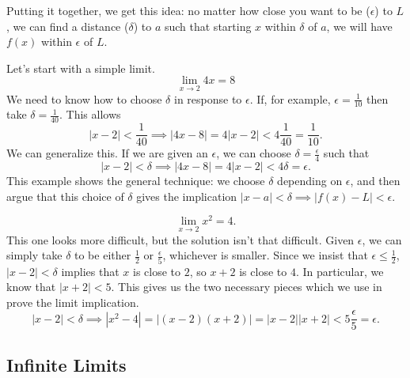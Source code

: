 \documentclass[fleqn]{report}
\begin{document}
Putting it together, we get this idea: no matter how close
you want to be ($\epsilon$) to $L$, we can find a
distance ($\delta$) to $a$ such that starting $x$ within $\delta$
of $a$, we will have $f(x)$ within $\epsilon$ of $L$.

\begin{example}
Let's start with a simple limit.
\begin{equation*}
\lim_{x \rightarrow 2} 4x = 8
\end{equation*}
We need to know how to choose $\delta$ in response to
$\epsilon$. 
If, for example, $\epsilon = \frac{1}{10}$ then take $\delta =
\frac{1}{40}$. This allows 
\begin{equation*}
|x-2| < \frac{1}{40} \implies |4x-8| = 4 |x-2| < 4
\frac{1}{40} = \frac{1}{10}.
\end{equation*}
We can generalize this. If we are given an $\epsilon$, we can
choose $\delta = \frac{\epsilon}{4}$ such that
\begin{equation*}
|x-2| < \delta \implies |4x-8| = 4 |x-2| < 4
\delta = \epsilon.
\end{equation*}
This example shows the general technique: we choose $\delta$
depending on $\epsilon$, and then argue that this choice
of $\delta$ gives the implication $|x-a| < \delta \implies
|f(x) - L| < \epsilon$.
\end{example}

\begin{example}
\begin{equation*}
\lim_{x \rightarrow 2} x^2 = 4.
\end{equation*}
This one looks more difficult, but the solution isn't that
difficult. Given $\epsilon$, we can simply take $\delta$ to
be either $\frac{1}{2}$ or $\frac{\epsilon}{5}$, whichever is
smaller. Since we insist that $\epsilon \leq \frac{1}{2}$,
$|x-2|< \delta$ implies that $x$ is close to $2$, so $x+2$ is
close to $4$. In particular, we know that $|x+2|<5$. This
gives us the two necessary pieces which we use in prove the
limit implication.
\begin{equation*}
|x-2| < \delta \implies |x^2-4| = |(x-2)(x+2)| = |x-2||x+2|
< 5 \frac{\epsilon}{5} = \epsilon.
\end{equation*}
\end{example}

\subsection{Infinite Limits}
\label{infinite-limits}
\end{document}
